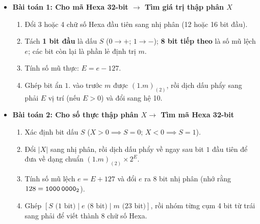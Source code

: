 \begin{tcolorbox}[bwbox, title={Quy trình 4 bước giải nhanh bài toán IEEE 754 32-bit}]
\begin{itemize}
    \item \textbf{Bài toán 1: Cho mã Hexa 32-bit $\rightarrow$ Tìm giá trị thập phân $X$}
    \begin{enumerate}
        \item Đổi 3 hoặc 4 chữ số Hexa đầu tiên sang nhị phân (12 hoặc 16 bit đầu).
        \item Tách \textbf{1 bit đầu} là dấu $S$ ($0 \rightarrow +$; $1 \rightarrow -$); \textbf{8 bit tiếp theo} là số mũ lệch $e$; các bit còn lại là phần lẻ định trị $m$.
        \item Tính số mũ thực: $E = e - 127$.
        \item Ghép bit ẩn $1.$ vào trước $m$ được $(1.m)_{(2)}$, rồi dịch dấu phẩy sang phải $E$ vị trí (nếu $E > 0$) và đổi sang hệ 10.
    \end{enumerate}
    \item \textbf{Bài toán 2: Cho số thực thập phân $X \rightarrow$ Tìm mã Hexa 32-bit}
    \begin{enumerate}
        \item Xác định bit dấu $S$ ($X > 0 \implies S = 0$; $X < 0 \implies S = 1$).
        \item Đổi $|X|$ sang nhị phân, rồi dịch dấu phẩy về ngay sau bit $1$ đầu tiên để đưa về dạng chuẩn $(1.m)_{(2)} \times 2^E$.
        \item Tính số mũ lệch $e = E + 127$ và đổi $e$ ra 8 bit nhị phân (nhớ rằng $128 = \texttt{1000\,0000}_2$).
        \item Ghép $[S\text{ (1 bit)} \mid e\text{ (8 bit)} \mid m\text{ (23 bit)}]$, rồi nhóm từng cụm 4 bit từ trái sang phải để viết thành 8 chữ số Hexa.
    \end{enumerate}
\end{itemize}
\end{tcolorbox}

